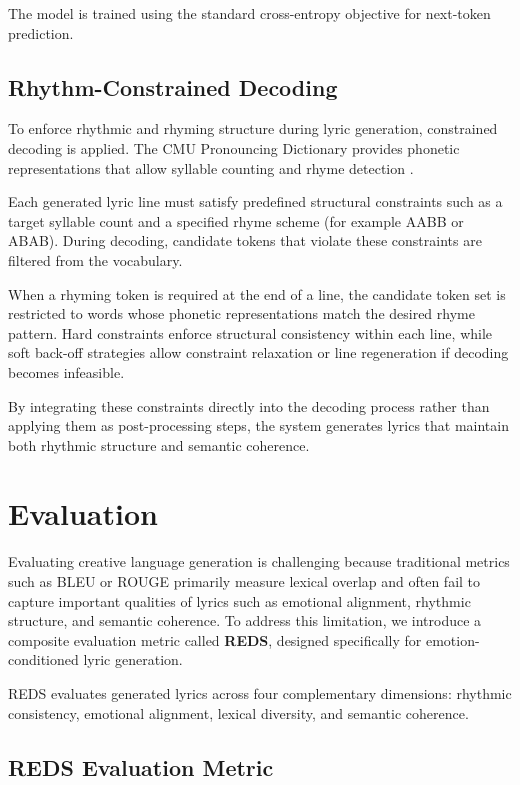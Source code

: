 \documentclass[11pt]{article}
\begin{document}
The model is trained using the standard cross-entropy objective for next-token prediction.

\subsection{Rhythm-Constrained Decoding}

To enforce rhythmic and rhyming structure during lyric generation, constrained decoding is applied. The CMU Pronouncing Dictionary provides phonetic representations that allow syllable counting and rhyme detection \cite{cmudict}.

Each generated lyric line must satisfy predefined structural constraints such as a target syllable count and a specified rhyme scheme (for example AABB or ABAB). During decoding, candidate tokens that violate these constraints are filtered from the vocabulary.

When a rhyming token is required at the end of a line, the candidate token set is restricted to words whose phonetic representations match the desired rhyme pattern. Hard constraints enforce structural consistency within each line, while soft back-off strategies allow constraint relaxation or line regeneration if decoding becomes infeasible.

By integrating these constraints directly into the decoding process rather than applying them as post-processing steps, the system generates lyrics that maintain both rhythmic structure and semantic coherence.

\section{Evaluation}

Evaluating creative language generation is challenging because traditional metrics such as BLEU or ROUGE primarily measure lexical overlap and often fail to capture important qualities of lyrics such as emotional alignment, rhythmic structure, and semantic coherence. To address this limitation, we introduce a composite evaluation metric called \textbf{REDS}, designed specifically for emotion-conditioned lyric generation.

REDS evaluates generated lyrics across four complementary dimensions: rhythmic consistency, emotional alignment, lexical diversity, and semantic coherence.

\subsection{REDS Evaluation Metric}
\end{document}
